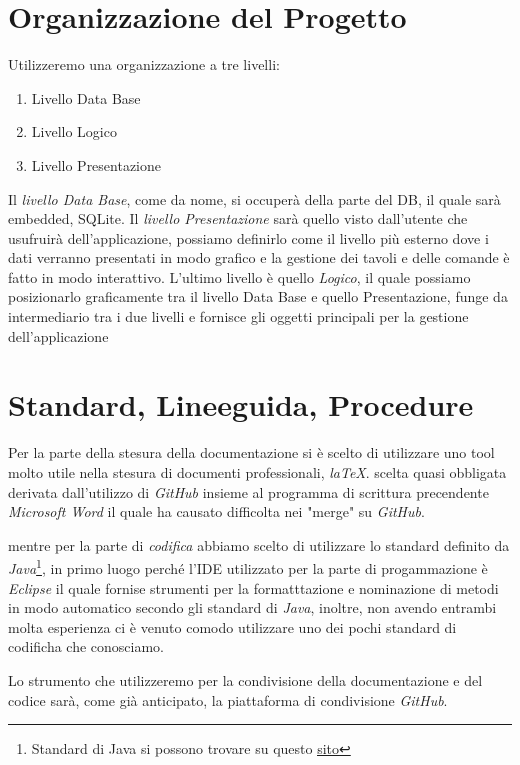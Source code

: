 \documentclass{book}
\begin{document}
\section{Organizzazione del Progetto}

Utilizzeremo una organizzazione a tre livelli:

\begin{enumerate}
    \item Livello Data Base
    \item Livello Logico
    \item Livello Presentazione
\end{enumerate}
Il \textit{livello Data Base}, come da nome, si occuperà della parte del DB, il quale sarà embedded, SQLite.
Il \textit{livello Presentazione} sarà quello visto dall'utente che usufruirà dell'applicazione, possiamo definirlo come il livello più esterno dove i dati verranno presentati in modo grafico e la gestione dei tavoli e delle comande è fatto in modo interattivo.
L'ultimo livello è quello \textit{Logico}, il quale possiamo posizionarlo graficamente tra il livello Data Base e quello Presentazione, funge da intermediario tra i due livelli e fornisce gli oggetti principali per la gestione dell'applicazione


\section{Standard, Lineeguida, Procedure}

Per la parte della stesura della documentazione si è scelto di utilizzare uno tool molto utile nella stesura di documenti professionali, \textit{laTeX}. scelta quasi obbligata derivata dall'utilizzo di \textit{GitHub} insieme al programma di scrittura precendente \textit{Microsoft Word} il quale ha causato difficolta nei "merge" su \textit{GitHub}.

 mentre per la parte di \textit{codifica} abbiamo scelto di utilizzare lo standard definito da \textit{Java}\footnote{Standard di Java si possono trovare su questo \href{https://www.oracle.com/java/technologies/javase/codeconventions-contents.html}{\underline{sito}}}, in primo luogo perché l'IDE utilizzato per la parte di progammazione è \textit{Eclipse} il quale fornise strumenti per la formatttazione e nominazione di metodi in modo automatico secondo gli standard di \textit{Java}, inoltre, non avendo entrambi molta esperienza ci è venuto comodo utilizzare uno dei pochi standard di codificha che conosciamo.

 Lo strumento che utilizzeremo per la condivisione della documentazione e del codice sarà, come già anticipato, la piattaforma di condivisione \textit{GitHub}.
\end{document}
